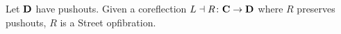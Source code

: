 %
%



\newcommand{\nice}{\emph{nice}}





\begin{thm}
	Let $ \mathbf{D} $ have pushouts. Given a coreflection $ L \dashv R \colon \mathbf{C} \to \mathbf{D} $ where $ R $ preserves pushouts, $ R $ is a Street opfibration.
\end{thm}

